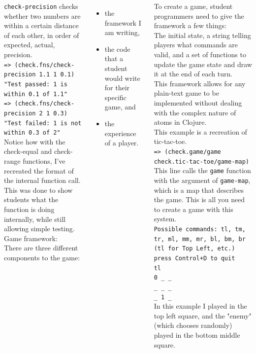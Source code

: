 \documentclass[17pt, a0paper, landscape,  margin=0mm, innermargin=10mm, blockverticalspace=3mm, colspace=3mm, subcolspace=3mm]{tikzposter}
\begin{document}
\begin{columns}
{\texttt{check-precision} checks whether two numbers are within a certain distance of each other, in order of expected, actual, precision. \\
\texttt{=> (check.fns/check-precision 1.1 1 0.1)} \\
\texttt{"Test passed: 1 is within 0.1 of 1.1"} \\
\texttt{=> (check.fns/check-precision 2 1 0.3)} \\
\texttt{"Test failed: 1 is not within 0.3 of 2"} \\
Notice how with the check-equal and check-range functions, I've recreated the format of the internal function call. \\
This was done to show students what the function is doing internally, while still allowing simple testing. \\
    Game framework: \\
    There are three different components to the game: 
    \begin{itemize}
    \item the framework I am writing,
    \item the code that a student would write for their specific game, and
    \item the experience of a player.
    \end{itemize}
    To create a game, student programmers need to give the framework a few things: \\
    The initial state, a string telling players what commands are valid, and a set of functions to update the game state and draw it at the end of each turn. \\
    This framework allows for any plain-text game to be implemented without dealing with the complex nature of atoms in Clojure. \\

    This example is a recreation of tic-tac-toe. \\
    \texttt{=> (check.game/game check.tic-tac-toe/game-map)} \\
    This line calls the \texttt{game} function with the argument of \texttt{game-map}, which is a map that describes the game. This is all you need to create a game with this system. \\
\texttt{Possible commands: tl, tm, tr, ml, mm, mr, bl, bm, br}
\texttt{(tl for Top Left, etc.)} \\
\texttt{press Control+D to quit} \\
\texttt{tl} \\
\texttt{0 \_ \_} \\
\texttt{\_ \_ \_ } \\
\texttt{\_ 1 \_ } \\
In this example I played in the top left square, and the "enemy" (which chooses randomly) played in the bottom middle square. 

}
\end{columns}
\end{document}
